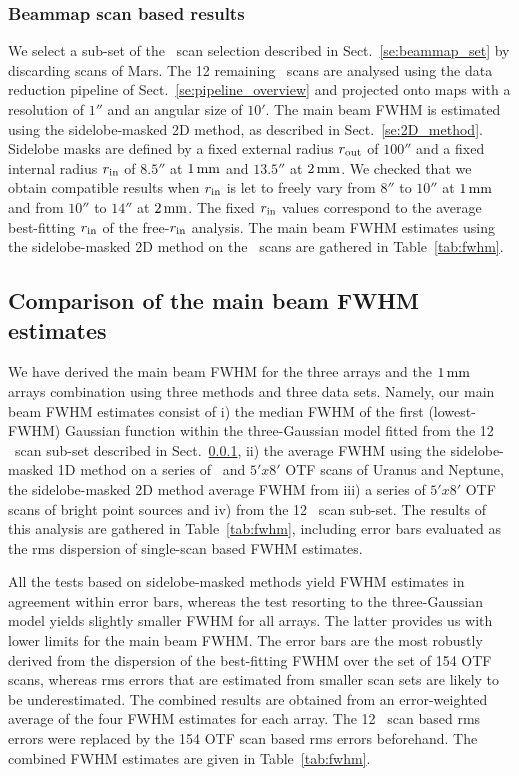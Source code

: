\subsubsection{Beammap scan based results}
\label{se:mb_with_beammap}

We select a sub-set of the \bm\ scan selection described in
Sect.~\ref{se:beammap_set} by discarding scans of Mars.
The 12 remaining \bm\ scans are analysed using the data reduction
pipeline of Sect.~\ref{se:pipeline_overview} and projected onto maps
with a resolution of $1''$ and an angular size of $10'$.    
The main beam FWHM is estimated using the sidelobe-masked 2D method, as
described in Sect.~\ref{se:2D_method}. Sidelobe masks are
defined by a fixed external radius $r_{\rm{out}}$ of $100''$ and a
fixed internal radius $r_{\rm{in}}$ of $8.5''$ at $1\,\rm{mm}$ and
$13.5''$ at $2\,\rm{mm}$. We checked that we obtain compatible results when
$r_{\rm{in}}$ is let to freely vary from $8''$ to $10''$ at
$1\,\rm{mm}$ and from $10''$ to $14''$ at $2\,\rm{mm}$. The fixed
$r_{\rm{in}}$ values correspond to the average best-fitting
$r_{\rm{in}}$ of the free-$r_{\rm{in}}$ analysis. The main beam FWHM
estimates using the sidelobe-masked 2D method on the \bm\ scans are
gathered in Table~\ref{tab:fwhm}.


\subsection{Comparison of the main beam FWHM estimates}
\label{se:fwhm_results}

We have derived the main beam FWHM for the three arrays and the
$1\,\rm{mm}$ arrays combination using three methods and three data
sets. Namely, our main beam FWHM estimates
consist of i) the median FWHM of the first (lowest-FWHM) Gaussian
function within the three-Gaussian model fitted from the 12 \bm\ scan
sub-set described in
Sect.~\ref{se:mb_with_beammap}, ii) the average FWHM using the
sidelobe-masked 1D method on a series of \bm\ and $5'x8'$ OTF scans of
Uranus and Neptune, the sidelobe-masked 2D method average FWHM
from iii) a series of $5'x8'$ OTF scans of bright point sources and
iv) from the 12 \bm\ scan sub-set. The results of this analysis are
gathered in Table~\ref{tab:fwhm}, including error bars evaluated as
the rms dispersion of single-scan based FWHM estimates.

All the tests based on sidelobe-masked methods yield FWHM estimates
in agreement within error bars, whereas the test resorting to the
three-Gaussian model yields slightly smaller FWHM for all arrays. The
latter provides us with lower limits for the main beam FWHM. The error
bars are the most robustly derived from the dispersion of the
best-fitting FWHM over the set of 154 OTF scans, whereas rms errors
that are estimated from smaller scan sets are likely to be
underestimated. The combined results are obtained from an error-weighted
average of the four FWHM estimates for each array. The 12 \bm\ scan
based rms errors were replaced by the 154 OTF scan based rms errors
beforehand.
The combined FWHM estimates are given in Table~\ref{tab:fwhm}.

